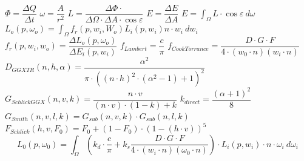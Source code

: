 \documentclass[
  11pt,
  a4paper,
  oneside
  ]{article}
\begin{document}
$\Phi =\dfrac{\Delta Q}{\Delta t}$ %
$\omega =\dfrac{A}{r^{2}}$ %
$L=\dfrac{\Delta \Phi \cdot }{\Delta \Omega \cdot \Delta A\cdot \cos \varepsilon }$ %
$E=\dfrac{\Delta E}{\Delta A}$ %
$E=\int _{\Omega }L\cdot \cos \varepsilon \ d\omega $ %
$L_{o}\left( p,\omega _{o}\right) =\int _{\Omega }f_{r}\left( p,w_{i},W_{o}\right)L_{i}\left( p,w_{i}\right)n\cdot w_{i} \ dw_{i}$ %
$f_{r}\left( p,w_{i},w_{o}\right) =\dfrac{\Delta L_{o}\left( p,\omega _{o}\right) }{\Delta E_{i}\left( p,w_{i}\right) }$ %
$f_{Lambert}=\dfrac{c}{\pi}$ %
$f_{CookTorrance}=\dfrac{D\cdot G\cdot F}{4\cdot \left( w_{0}\cdot n\right) \left( w_{i}\cdot n\right) }$ %
$D_{GGXTR}\left( n,h,\alpha \right) =\dfrac{\alpha ^{2}}{\pi \cdot \left( \left( n\cdot h\right) ^{2}\cdot \left( \alpha ^{2}-1\right) +1\right) ^{2}}$ %
$G_{SchlickGGX}\left( n,v,k\right) =\dfrac{n\cdot v}{\left( n\cdot v\right) \cdot \left( 1-k\right) +k}$ %
$k_{direct}=\dfrac{\left( \alpha +1\right) ^{2}}{8}$ %
$G_{Smith}\left( n,v,l,k\right) =G_{sub}\left( n,v,k\right) \cdot G_{sub}\left( n,l,k\right)$ %
$F_{Schlick}\left( h,v,F_{0}\right) =F_{0}+\left( 1-F_{0}\right) \cdot \left( 1-\left( h\cdot v\right) \right) ^{5}$ %
\[ L_{0}\left( p,\omega _{0}\right) =\int _{\Omega }^{}\left( k_{d}\cdot \dfrac{c}{\pi }+k_{s}\dfrac{D\cdot G\cdot F}{4\cdot \left( w_{i}\cdot n\right) \left( \omega _{0}\cdot n\right) }\right) \cdot L_{i}\left( p,w_{i}\right) \cdot n\cdot \omega _{i} \ d\omega _{i}\] %

\cite{reasonsForPbr1,reasonsForPbr2,pbrGuide,learnOpenGL} %
\cite{Beyerer2016} %
\cite{learnOpenGL, irrlichtOrg} %
\cite{GrundlagenLichtTechnik,radiometrischeGrundbegriffe,vgb,learnOpenGL} %
\cite{gMueller} %
\cite{GrundlagenLichtTechnik}%
\cite{GrundlagenLichtTechnik}%
\cite{GRAY197813,Ryer97lightmeasurement,renderingEquationArticle} %
\cite{learnOpenGL} 
\cite{theRenderingEquation} %
\cite{learnOpenGL}%
\cite{openGlWolf,learnOpenGL}%
\cite{irrlichtOrg,uniUlm} %
\cite{irrlichtOrg}
\cite{realTimeRendering4th,learnOpenGL,uniUlm,irrlichtOrg} %
\cite{irrlichtOrg,pbrGuide,learnOpenGL,googleFilamentPbr,realTimeRendering4th} %
\cite{irrlichtOrg,pbrGuide,learnOpenGL,googleFilamentPbr,realTimeRendering4th} %
\cite{realTimeRendering4th}
\cite{realTimeRendering4th,irrlichtOrg,learnOpenGL}%
\cite{realTimeRendering4th,learnOpenGL}%
\cite{realTimeRendering4th}%
\cite{learnOpenGL}
\cite{learnOpenGL,rtrPaper}
\cite{learnOpenGL,rtrPaper,realTimeRendering4th} %
\cite{learnOpenGL,rtrPaper,realTimeRendering4th} %
\cite{learnOpenGL}
\cite{learnOpenGL}
\cite{rtrPaper}%
\cite{rtrPaper}
\cite{learnOpenGL}
\cite{learnOpenGL}
\cite{realTimeRendering4th,rtrPaper}%
\cite{realTimeRendering4th,rtrPaper,learnOpenGL}%
\cite{learnOpenGL}
\cite{learnOpenGL}
\end{document}

